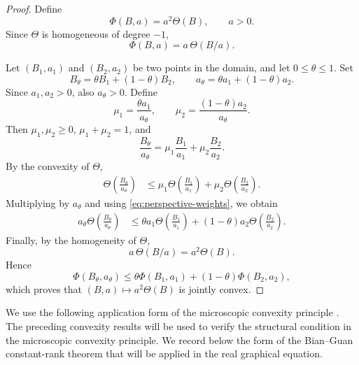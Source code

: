 \documentclass{article}
\numberwithin{equation}{section}
\begin{document}
\begin{proof}
Define
\[
\Phi(B,a)=a^2\Theta(B),\qquad a>0.
\]
Since $\Theta$ is homogeneous of degree $-1$,
\begin{equation}\label{eq:perspective-identity}
\Phi(B,a)
=
a\,\Theta(B/a).
\end{equation}

Let $(B_1,a_1)$ and $(B_2,a_2)$ be two points in the domain, and let
$0\le\theta\le1$. Set
\begin{equation}\label{eq:perspective-combination}
B_\theta
=
\theta B_1+(1-\theta)B_2,
\qquad
a_\theta
=
\theta a_1+(1-\theta)a_2.
\end{equation}
Since $a_1,a_2>0$, also $a_\theta>0$. Define
\begin{equation}\label{eq:perspective-weights}
\mu_1
=
\frac{\theta a_1}{a_\theta},
\qquad
\mu_2
=
\frac{(1-\theta)a_2}{a_\theta}.
\end{equation}
Then $\mu_1,\mu_2\ge0$, $\mu_1+\mu_2=1$, and
\begin{equation}\label{eq:perspective-scaled-combination}
\frac{B_\theta}{a_\theta}
=
\mu_1\frac{B_1}{a_1}
+
\mu_2\frac{B_2}{a_2}.
\end{equation}
By the convexity of $\Theta$,
\begin{align}
\Theta\left(\frac{B_\theta}{a_\theta}\right)
&\le
\mu_1\Theta\left(\frac{B_1}{a_1}\right)
+
\mu_2\Theta\left(\frac{B_2}{a_2}\right).
\end{align}
Multiplying by $a_\theta$ and using
\eqref{eq:perspective-weights}, we obtain
\begin{align}
a_\theta
\Theta\left(\frac{B_\theta}{a_\theta}\right)
&\le
\theta a_1
\Theta\left(\frac{B_1}{a_1}\right)
+
(1-\theta)a_2
\Theta\left(\frac{B_2}{a_2}\right).
\end{align}
Finally, by the homogeneity of $\Theta$,
\[
a\,\Theta(B/a)=a^2\Theta(B).
\]
Hence
\[
\Phi(B_\theta,a_\theta)
\le
\theta\Phi(B_1,a_1)
+
(1-\theta)\Phi(B_2,a_2),
\]
which proves that $(B,a)\mapsto a^2\Theta(B)$ is jointly convex.
\end{proof}


We use the following application form of the microscopic convexity principle \cite{BG09,BG10}. The preceding convexity results will be used to verify the structural
condition in the microscopic convexity principle. We record below the
form of the Bian--Guan constant-rank theorem that will be applied in
the real graphical equation.
\end{document}
